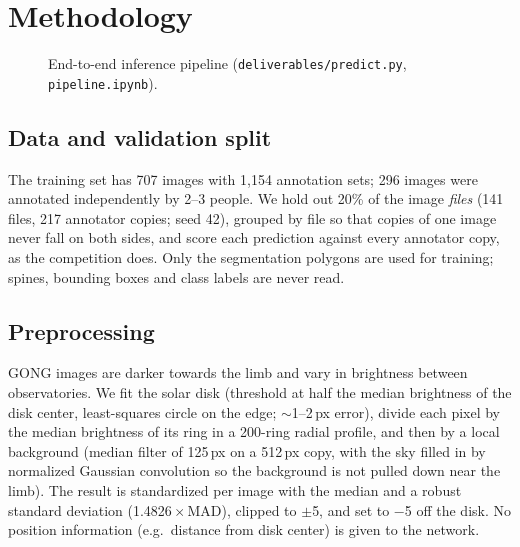\documentclass[sigconf]{acmart}
\begin{document}
\section{Methodology}\label{sec:methodology}

\begin{figure}[t]
\centering
{}
\caption{End-to-end inference pipeline (\texttt{deliverables/predict.py}, \texttt{pipeline.ipynb}).}
\label{fig:pipeline}
\end{figure}

\subsection{Data and validation split}
    The training set has 707 images with 1{,}154 annotation sets; 296 images were annotated independently by 2--3 people. We hold out 20\% of the image \emph{files} (141 files, 217 annotator copies; seed 42), grouped by file so that copies of one image never fall on both sides, and score each prediction against every annotator copy, as the competition does. Only the segmentation polygons are used for training; spines, bounding boxes and class labels are never read.

\subsection{Preprocessing}
    GONG images are darker towards the limb and vary in brightness between observatories. We fit the solar disk (threshold at half the median brightness of the disk center, least-squares circle on the edge; $\sim$1--2\,px error), divide each pixel by the median brightness of its ring in a 200-ring radial profile, and then by a local background (median filter of 125\,px on a 512\,px copy, with the sky filled in by normalized Gaussian convolution so the background is not pulled down near the limb). The result is standardized per image with the median and a robust standard deviation (1.4826\,$\times$\,MAD), clipped to $\pm$5, and set to $-$5 off the disk. No position information (e.g.\ distance from disk center) is given to the network.
\end{document}
